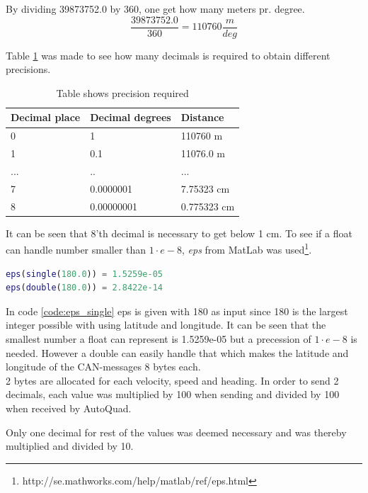 By dividing 39873752.0 by 360, one get how many meters pr. degree.
\begin{equation}
\frac{39873752.0}{360} = 110760 \frac{m}{deg}
\end{equation}

Table \ref{tab:precision_latlon} was made to see how many decimals is required to obtain different precisions.
\begin{table}[H]
\centering
\caption{Table shows precision required}
\label{tab:precision_latlon}
\begin{tabular}{@{}|l|l|l|@{}}
\toprule
Decimal place & Decimal degrees & Distance    \\ \midrule
0             & 1               & 110760 m    \\ \midrule
1             & 0.1             & 11076.0 m   \\ \midrule
...           & ..              & ...         \\ \midrule
7             & 0.0000001       & 7.75323 cm  \\ \midrule
8             & 0.00000001      & 0.775323 cm \\ \bottomrule
\end{tabular}
\end{table}

It can be seen that 8'th decimal is necessary to get below 1 cm. 
To see if a float can handle number smaller than $1\cdot e-8$, \textit{eps} from MatLab was used\footnote{http://se.mathworks.com/help/matlab/ref/eps.html}.
\begin{lstlisting}[language = matlab, caption = Check if float is precise enough of a double has to be used, label=code:eps_single]
eps(single(180.0)) = 1.5259e-05
eps(double(180.0)) = 2.8422e-14
\end{lstlisting}
In code \ref{code:eps_single} eps is given with 180 as input since 180 is the largest integer possible with using latitude and longitude.
It can be seen that the smallest number a float can represent is 1.5259e-05 but a precession of $1\cdot e-8$ is needed.
However a double can easily handle that which makes the latitude and longitude of the CAN-messages 8 bytes each. \\

2 bytes are allocated for each velocity, speed and heading. In order to send 2 decimals, each value was multiplied by 100 when sending and divided by 100 when received by AutoQuad.

Only one decimal for rest of the values was deemed necessary and was thereby multiplied and divided by 10. \\

